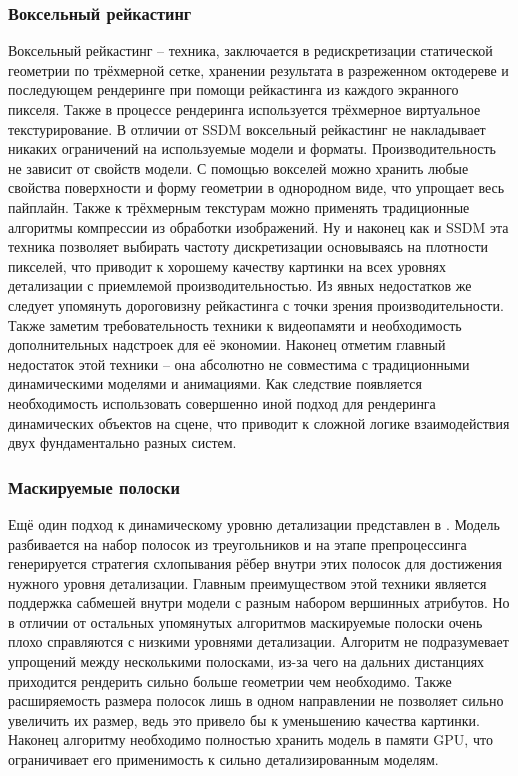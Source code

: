 \documentclass[12pt]{extarticle}
\begin{document}
\subsubsection{Воксельный рейкастинг}
Воксельный рейкастинг \cite{cur_and_next_parallelism} -- техника, заключается в редискретизации статической геометрии по трёхмерной сетке, хранении результата в разреженном октодереве и последующем рендеринге при помощи рейкастинга из каждого экранного пикселя. Также в процессе рендеринга используется трёхмерное виртуальное текстурирование. В отличии от SSDM воксельный рейкастинг не накладывает никаких ограничений на используемые модели и форматы. Производительность не зависит от свойств модели. С помощью вокселей можно хранить любые свойства поверхности и форму геометрии в однородном виде, что упрощает весь пайплайн. Также к трёхмерным текстурам можно применять традиционные алгоритмы компрессии из обработки изображений. Ну и наконец как и SSDM эта техника позволяет выбирать частоту дискретизации основываясь на плотности пикселей, что приводит к хорошему качеству картинки на всех уровнях детализации с приемлемой производительностью. Из явных недостатков же следует упомянуть дороговизну рейкастинга с точки зрения производительности. Также заметим требовательность техники к видеопамяти и необходимость дополнительных надстроек для её экономии. Наконец отметим главный недостаток этой техники -- она абсолютно не совместима с традиционными динамическими моделями и анимациями. Как следствие появляется необходимость использовать совершенно иной подход для рендеринга динамических объектов на сцене, что приводит к сложной логике взаимодействия двух фундаментально разных систем.

\subsubsection{Маскируемые полоски}
Ещё один подход к динамическому уровню детализации представлен в \cite{RIPOLLES2009184}. Модель разбивается на набор полосок из треугольников и на этапе препроцессинга генерируется стратегия схлопывания рёбер внутри этих полосок для достижения нужного уровня детализации. Главным преимуществом этой техники является поддержка сабмешей внутри модели с разным набором вершинных атрибутов. Но в отличии от остальных упомянутых алгоритмов маскируемые полоски очень плохо справляются с низкими уровнями детализации. Алгоритм не подразумевает упрощений между несколькими полосками, из-за чего на дальних дистанциях приходится рендерить сильно больше геометрии чем необходимо. Также расширяемость размера полосок лишь в одном направлении не позволяет сильно увеличить их размер, ведь это привело бы к уменьшению качества картинки. Наконец алгоритму необходимо полностью хранить модель в памяти GPU, что ограничивает его применимость к сильно детализированным моделям.
\end{document}
